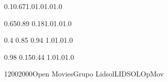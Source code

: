\documentclass[a4paper,10pt]{report}
\begin{document}
 \thispagestyle{empty}
 \begin{landscape}
 
 \setslotsize{2.8cm}{0.25cm}
 \settextframe{1.0mm}
 
 
 
 

   {0.1}{0.67}{1.0}{1.0}{1.0}{1.0}   
 
        {0.65}{0.89} {0.18}{1.0}{1.0}{1.0}

 {0.4} {0.85} {0.94} {1.0}{1.0}{1.0}
 
 

 

 
 
 
   {0.98} {0.15}{0.44} {1.0}{1.0}{1.0}
 
 
 \begin{timetable}
 

 
   
   
   
   
   
    
  
     {1200}{2000}{Open Movies}{Grupo Lidsol}{{\tiny LIDSOL}}{OpMov}
   

\end{timetable}
\end{landscape}
\end{document}
